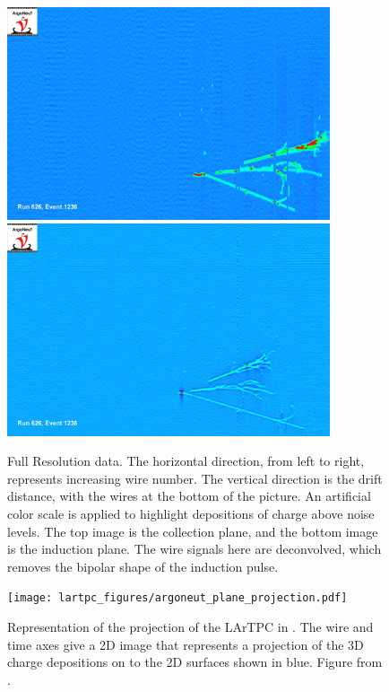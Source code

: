 \begin{figure}[htbp]
  \centering
  \includegraphics[width=0.85\textwidth]{lartpc_figures/R626_E1236_collection.png}
  \includegraphics[width=0.85\textwidth]{lartpc_figures/R626_E1236_induction.png}
  \caption[\argoneut Event Images]{Full Resolution \argoneut data.  The horizontal direction, from left to right, represents increasing wire number.  The vertical direction is the drift distance, with the wires at the bottom of the picture.  An artificial color scale is applied to highlight depositions of charge above noise levels.  The top image is the collection plane, and the bottom image is the induction plane.  The wire signals here are deconvolved, which removes the bipolar shape of the induction pulse.}
  \label{fig:argoneut_data}
\end{figure}

\begin{figure}[htbp]
  \centering
  \texttt{[image: lartpc\_figures/argoneut\_plane\_projection.pdf]}
  \caption[\argoneut 3D projection]{Representation of the projection of the LArTPC in \argoneut.  The wire and time axes give a 2D image that represents a projection of the 3D charge depositions on to the 2D surfaces shown in blue.  Figure from \cite{Anderson:2012vc}.}
  \label{fig:argoneut_projection}
\end{figure}

